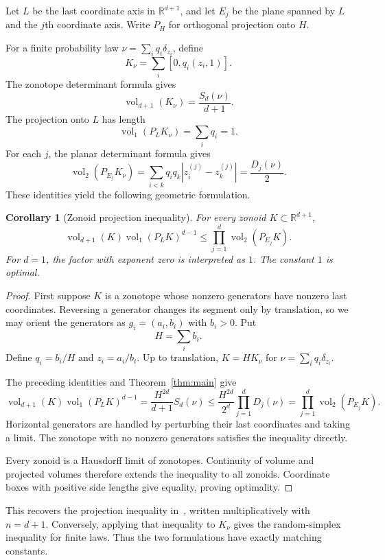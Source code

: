 \documentclass[11pt]{article}
\newtheorem{corollary}[theorem]{Corollary}
\theoremstyle{remark}
\newcommand{\R}{\mathbb{R}}
\newcommand{\vol}{\operatorname{vol}}
\begin{document}
\begin{aiblock}



Let $L$ be the last coordinate axis in $\R^{d+1}$, and let $E_j$ be
the plane spanned by $L$ and the $j$th coordinate axis. Write $P_H$
for orthogonal projection onto $H$.

For a finite probability law $\nu=\sum_iq_i\delta_{z_i}$, define
$$
K_\nu=\sum_i[0,q_i(z_i,1)].
$$
The zonotope determinant formula gives
$$
\vol_{d+1}(K_\nu)=\frac{S_d(\nu)}{d+1}.
$$
The projection onto $L$ has length
$$
\vol_1(P_LK_\nu)=\sum_iq_i=1.
$$
For each $j$, the planar determinant formula gives
$$
\vol_2(P_{E_j}K_\nu)=\sum_{i<k}q_iq_k|z_i^{(j)}-z_k^{(j)}|=\frac{D_j(\nu)}2.
$$
These identities yield the following geometric formulation.

\begin{corollary}[Zonoid projection inequality]
For every zonoid $K\subset\R^{d+1}$,
$$
\vol_{d+1}(K)\vol_1(P_LK)^{d-1}\leq\prod_{j=1}^d\vol_2(P_{E_j}K).
$$
For $d=1$, the factor with exponent zero is interpreted as $1$.
The constant $1$ is optimal.
\end{corollary}

\begin{proof}
First suppose $K$ is a zonotope whose nonzero generators have nonzero
last coordinates. Reversing a generator changes its segment only by
translation, so we may orient the generators as $g_i=(a_i,b_i)$ with
$b_i>0$. Put
$$
H=\sum_i b_i.
$$
Define $q_i=b_i/H$ and $z_i=a_i/b_i$. Up to translation,
$K=HK_\nu$ for $\nu=\sum_iq_i\delta_{z_i}$.

The preceding identities and Theorem~\ref{thm:main} give
$$
\vol_{d+1}(K)\vol_1(P_LK)^{d-1}
=\frac{H^{2d}}{d+1}S_d(\nu)
\leq\frac{H^{2d}}{2^d}\prod_{j=1}^dD_j(\nu)
=\prod_{j=1}^d\vol_2(P_{E_j}K).
$$
Horizontal generators are handled by perturbing their last coordinates
and taking a limit. The zonotope with no nonzero generators satisfies
the inequality directly.

Every zonoid is a Hausdorff limit of zonotopes. Continuity of volume
and projected volumes therefore extends the inequality to all zonoids.
Coordinate boxes with positive side lengths give equality, proving
optimality.
\end{proof}

This recovers the projection inequality in~\cite[Eq.~(2)]{AVS},
written multiplicatively with $n=d+1$. Conversely, applying that
inequality to $K_\nu$ gives the random-simplex inequality for finite
laws. Thus the two formulations have exactly matching constants.



\end{aiblock}
\end{document}
